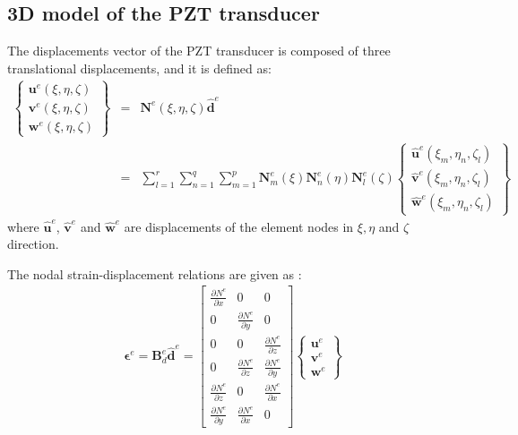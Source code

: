 \documentclass[a4paper,12pt]{article}
\begin{document}
{\subsection{3D model of the PZT transducer}
\label{sec:3D_SEM}
The displacements vector of the PZT transducer is composed of three translational displacements, and it is defined as:
\begin{eqnarray}
\left \{ \begin{array}{c}
\textbf{u}^e(\xi,\eta,\zeta) \\
\textbf{v}^e(\xi,\eta,\zeta) \\
\textbf{w}^e(\xi,\eta,\zeta)
\end{array} \right\}
& = & \textbf{N}^e(\xi,\eta, \zeta)\widehat{\textbf{d}}^e\nonumber\\
& = & \sum_{l=1}^r\sum_{n=1}^q\sum_{m=1}^p\textbf{N}_m^e(\xi)\textbf{N}_n^e(\eta)\textbf{N}_l^e(\zeta)
\left \{ \begin{array}{c}
\widehat{\textbf{u}}^e(\xi_m,\eta_n,\zeta_l) \\
\widehat{\textbf{v}}^e(\xi_m,\eta_n,\zeta_l) \\
\widehat{\textbf{w}}^e(\xi_m,\eta_n,\zeta_l)
\end{array} \right\}
\label{eq:3D_displ}
\end{eqnarray}
where \(\widehat{\textbf{u}}^e\), \(\widehat{\textbf{v}}^e\) and 
\(\widehat{\textbf{w}}^e\) are displacements of the element nodes in \(\xi,\eta\) and \(\zeta\) direction.

The nodal strain-displacement relations are given as \cite{kudela20093d}:
\begin{eqnarray}
\boldsymbol{\epsilon}^e=\textbf{B}_{d}^e\widehat{\textbf{d}}^e=
\left [
\begin{array}{ccc}
\frac{\partial N^e}{\partial x} & 0 & 0\\
0 & \frac{\partial N^e}{\partial y} & 0\\
0 & 0 & \frac{\partial N^e}{\partial z}\\
0 & \frac{\partial N^e}{\partial z} & \frac{\partial N^e}{\partial y}\\
\frac{\partial N^e}{\partial z} & 0 & \frac{\partial N^e}{\partial x}\\
\frac{\partial N^e}{\partial y} & \frac{\partial N^e}{\partial x} & 0
\end{array} \right]
\left \{ \begin{array}{c}
\textbf{u}^e \\
\textbf{v}^e \\
\textbf{w}^e
\end{array} \right\}
\end{eqnarray}

}
\end{document}
